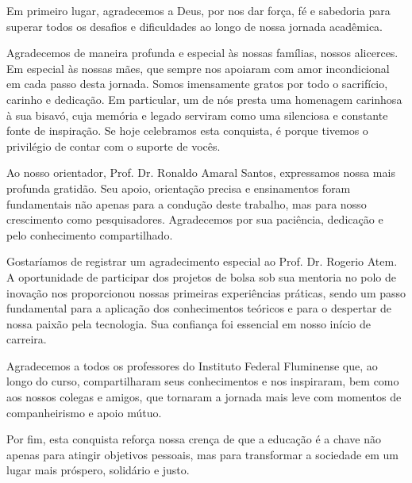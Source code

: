 \begin{agradecimentos}

Em primeiro lugar, agradecemos a Deus, por nos dar força, fé e sabedoria para superar todos os desafios e dificuldades ao longo de nossa jornada acadêmica.

Agradecemos de maneira profunda e especial às nossas famílias, nossos alicerces. Em especial às nossas mães, que sempre nos apoiaram com amor incondicional em cada passo desta jornada. Somos imensamente gratos por todo o sacrifício, carinho e dedicação. Em particular, um de nós presta uma homenagem carinhosa à sua bisavó, cuja memória e legado serviram como uma silenciosa e constante fonte de inspiração. Se hoje celebramos esta conquista, é porque tivemos o privilégio de contar com o suporte de vocês.

Ao nosso orientador, Prof. Dr. Ronaldo Amaral Santos, expressamos nossa mais profunda gratidão. Seu apoio, orientação precisa e ensinamentos foram fundamentais não apenas para a condução deste trabalho, mas para nosso crescimento como pesquisadores. Agradecemos por sua paciência, dedicação e pelo conhecimento compartilhado.

Gostaríamos de registrar um agradecimento especial ao Prof. Dr. Rogerio Atem. A oportunidade de participar dos projetos de bolsa sob sua mentoria no polo de inovação nos proporcionou nossas primeiras experiências práticas, sendo um passo fundamental para a aplicação dos conhecimentos teóricos e para o despertar de nossa paixão pela tecnologia. Sua confiança foi essencial em nosso início de carreira.

Agradecemos a todos os professores do Instituto Federal Fluminense que, ao longo do curso, compartilharam seus conhecimentos e nos inspiraram, bem como aos nossos colegas e amigos, que tornaram a jornada mais leve com momentos de companheirismo e apoio mútuo.

Por fim, esta conquista reforça nossa crença de que a educação é a chave não apenas para atingir objetivos pessoais, mas para transformar a sociedade em um lugar mais próspero, solidário e justo.

\end{agradecimentos}